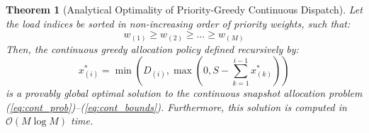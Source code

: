 \documentclass[11pt,a4paper]{article}
\newtheorem{theorem}{Theorem}
\theoremstyle{definition}
\theoremstyle{remark}
\begin{document}
\begin{theorem}[Analytical Optimality of Priority-Greedy Continuous Dispatch]
\label{thm:greedy_optimal}
Let the load indices be sorted in non-increasing order of priority weights, such that:
\begin{equation}
w_{(1)} \ge w_{(2)} \ge \dots \ge w_{(M)}
\end{equation}
Then, the continuous greedy allocation policy defined recursively by:
\begin{equation}
x_{(i)}^* = \min \left( D_{(i)}, \max\left(0, S - \sum_{k=1}^{i-1} x_{(k)}^* \right) \right)
\label{eq:greedy_rule}
\end{equation}
is a provably global optimal solution to the continuous snapshot allocation problem (\ref{eq:cont_prob})--(\ref{eq:cont_bounds}). Furthermore, this solution is computed in $\mathcal{O}(M \log M)$ time.
\end{theorem}
\end{document}
